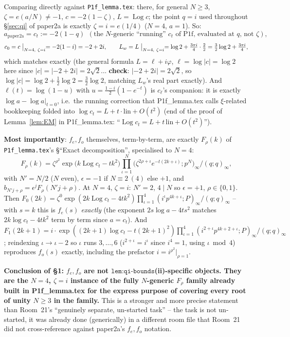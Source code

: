\documentclass[11pt]{article}
\begin{document}
Comparing directly against \texttt{P1f\_lemma.tex}: there, for general $N\ge3$, $\zeta=e(a/N)\ne-1$,
$c=-2(1-\zeta)$, $L=\operatorname{Log}c$; the point $q=i$ used throughout \S\ref{sec:qi} of
paper2a is exactly $\zeta=i=e(1/4)$ ($N=4$, $a=1$). So:
\[
  a_{\text{paper2a}}=c_t:=-2(1-q)\ \ (\text{the $N$-generic ``running'' $c_t$ of P1f, evaluated at $q$, not $\zeta$}),
\]
\[
  c_0=c\bigm|_{N=4,\ \zeta=i}=-2(1-i)=-2+2i,\qquad L_w=L\bigm|_{N=4,\ \zeta=i}=\log2+\tfrac{3\pi i}4\cdot\tfrac2{2}
  =\tfrac32\log2+\tfrac{3\pi i}4,
\]
which matches exactly (the general formula $L=\ell+i\varphi$, $\ell=\log|c|=\log2$ here since
$|c|=|-2+2i|=2\sqrt2$... \textbf{check}: $|-2+2i|=2\sqrt2$, so $\log|c|=\log2+\tfrac12\log2=\tfrac32\log2$,
matching $L_w$'s real part exactly). And $\ell(t)=\log(1-u)$ with $u=\frac{1-i}2(1-e^{-t})$ is
$c_\ell$'s companion: it is exactly $\log a-\log a|_{t=0}$, i.e.\ the running correction that
P1f\_lemma.tex calls $\xi$-related bookkeeping folded into $\log c_t=L+t\cdot\mathrm{lin}+O(t^2)$
(end of the proof of Lemma~\ref{lem:EM} in P1f\_lemma.tex: ``$\operatorname{Log}c_t=L+t\,\mathrm{lin}+O(t^2)$'').

\textbf{Most importantly}: $f_e,f_o$ themselves, term-by-term, are exactly $F_\rho(k)$ of
\texttt{P1f\_lemma.tex}'s \S``Exact decomposition'', specialised to $N=4$:
\[
  F_\rho(k)=\zeta^{\rho^2}\exp\bigl(k\operatorname{Log}c_t-tk^2\bigr)
  \prod_{\iota=1}^N\bigl(\zeta^{2\rho+\iota}e^{-t(2k+\iota)};p^N\bigr)_\infty\Big/(q;q)_\infty,
\]
with $N'=N/2$ ($N$ even), $\epsilon=-1$ if $N\equiv2\ (4)$ else $+1$, and
$b_{N'j+\rho}=\epsilon^jF_\rho(N'j+\rho)$. At $N=4$, $\zeta=i$: $N'=2$, $4\mid N$ so $\epsilon=+1$,
$\rho\in\{0,1\}$. Then $F_0(2k)=\zeta^0\exp(2k\operatorname{Log}c_t-4tk^2)\prod_{\iota=1}^4(i^\iota
p^{4k+\iota};P)_\infty/(q;q)_\infty$ -- with $s=k$ this is $f_e(s)$ \emph{exactly} (the exponent
$2s\log a-4ts^2$ matches $2k\log c_t-4tk^2$ term by term since $a=c_t$). And $F_1(2k+1)=i\cdot
\exp((2k+1)\log c_t-t(2k+1)^2)\prod_{\iota=1}^4(i^{2+\iota}p^{4k+2+\iota};P)_\infty/(q;q)_\infty$;
reindexing $\iota\to\iota-2$ so $\iota$ runs $3,\dots,6$ ($i^{2+\iota}=i^\iota$ since $i^4=1$, using
$\iota\bmod4$) reproduces $f_o(s)$ exactly, including the prefactor $i=i^{\rho^2}|_{\rho=1}$.

\textbf{Conclusion of \S1: $f_e,f_o$ are not $\texttt{lem:qi-bounds}$(ii)-specific objects. They
are the $N=4$, $\zeta=i$ instance of the fully $N$-generic $F_\rho$ family already built in
P1f\_lemma.tex for the express purpose of covering every root of unity $N\ge3$ in the family.}
This is a stronger and more precise statement than Room~21's ``genuinely separate, un-started
task'' -- the task is not un-started, it was already done (generically) in a different room file
that Room~21 did not cross-reference against paper2a's $f_e,f_o$ notation.
\end{document}

